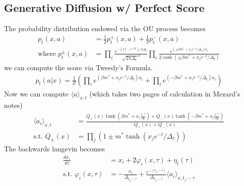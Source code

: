 \subsection{Generative Diffusion w/ Perfect Score}
The probability distribution endowed via the OU process becomes
\begin{align}
	p_t(x,a) & = \frac{1}{2} p_t^+(x,a) + \frac{1}{2} p_t^-(x,a)\\
	\text{where } p_t^{\pm}(x,a) & = \prod_i \frac{e^{-(x^2_i - e^{-2t})/2\Delta_t}}{\sqrt{2\pi \Delta_t}^d} \prod_i \frac{e^{(\pm \beta m^* + x_i e^{-t}/\Delta_t)a_i}}{2 \cosh(\pm \beta m^* + x_i e^{-t} /\Delta_t)}
\end{align}
we can compute the score via Tweedy's Formula. 
\begin{align}
	p_t(a |x) = \frac{1}{Z} \left( \prod_i e^{(\beta m^* + x_i e^{-t}/\Delta_t) a_i}  + \prod_i e^{(-\beta m^* + x_i e^{-t}/\Delta_t) a_i} \right)
\end{align}
Now we can compute $\langle a\rangle_{x,t}$ (which takes two pages of calculation in Mezard's notes)
\begin{align}
	\langle a_i \rangle_{x,t} & = \frac{Q_+(x) \tanh(\beta m^* + x_i \frac{e^{-t}}{\Delta_t}) +  Q_-(x) \tanh(- \beta m^* + x_i \frac{e^{-t}}{\Delta_t})}{Q_+(x) + Q_-(x)}\\
	\text{s.t. } Q_{\pm}(x) & = \prod_j(1 \pm m^* \tanh (x_j e^{-t}/ \Delta_t))
\end{align}
The backwards langevin becomes
\begin{align}
	\frac{dx_i}{d\tau} & = x_i  + 2\varphi_i(x,\tau) + \eta_i(\tau)\\
	\text{s.t. }\varphi_i(x,\tau) & = - \frac{x_i}{\Delta_{t_g - \tau}} + \frac{e^{-(t_f -\tau)}}{\Delta_{t_f -\tau}} \langle a_i \rangle_{x, t_f-\tau}
\end{align}
